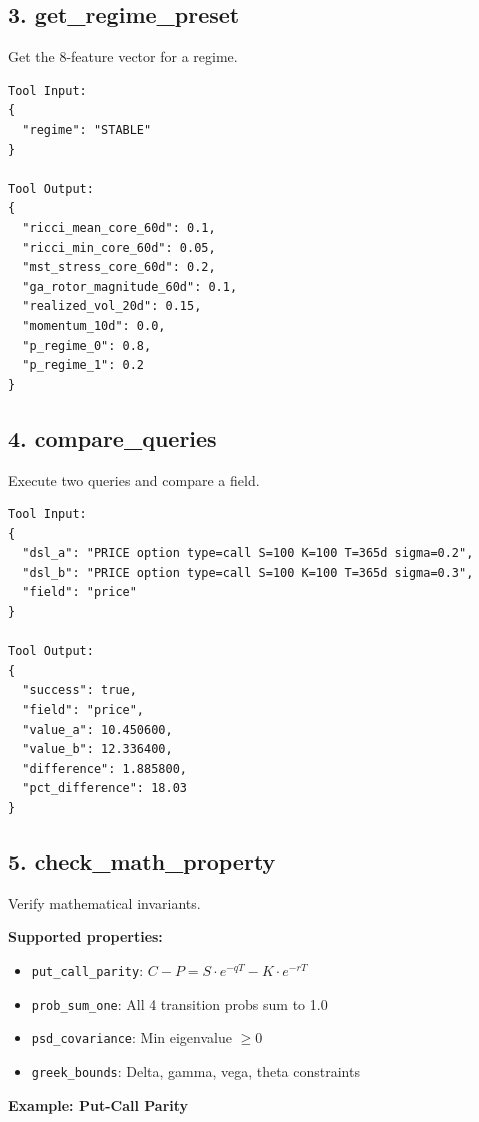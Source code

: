 \documentclass[12pt,oneside,openany]{book}
\begin{document}
\subsection{3. get\_regime\_preset}

Get the 8-feature vector for a regime.

\begin{lstlisting}
Tool Input:
{
  "regime": "STABLE"
}

Tool Output:
{
  "ricci_mean_core_60d": 0.1,
  "ricci_min_core_60d": 0.05,
  "mst_stress_core_60d": 0.2,
  "ga_rotor_magnitude_60d": 0.1,
  "realized_vol_20d": 0.15,
  "momentum_10d": 0.0,
  "p_regime_0": 0.8,
  "p_regime_1": 0.2
}
\end{lstlisting}

\subsection{4. compare\_queries}

Execute two queries and compare a field.

\begin{lstlisting}
Tool Input:
{
  "dsl_a": "PRICE option type=call S=100 K=100 T=365d sigma=0.2",
  "dsl_b": "PRICE option type=call S=100 K=100 T=365d sigma=0.3",
  "field": "price"
}

Tool Output:
{
  "success": true,
  "field": "price",
  "value_a": 10.450600,
  "value_b": 12.336400,
  "difference": 1.885800,
  "pct_difference": 18.03
}
\end{lstlisting}

\subsection{5. check\_math\_property}

Verify mathematical invariants.

\textbf{Supported properties:}

\begin{itemize}
    \item \texttt{put\_call\_parity}: $C - P = S \cdot e^{-qT} - K \cdot e^{-rT}$
    \item \texttt{prob\_sum\_one}: All 4 transition probs sum to 1.0
    \item \texttt{psd\_covariance}: Min eigenvalue $\geq 0$
    \item \texttt{greek\_bounds}: Delta, gamma, vega, theta constraints
\end{itemize}

\textbf{Example: Put-Call Parity}
\end{document}
